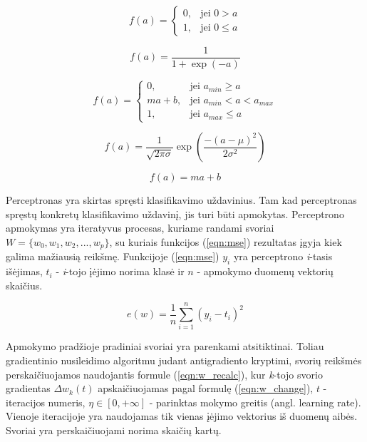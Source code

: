 \begin{equation}
	\label{eqn:unitStep}
	f(a) =
	\begin{cases}
		0, & \mbox{jei } 0 > a \\
		1, & \mbox{jei } 0 \leq a
	\end{cases}
\end{equation}

\begin{equation}
	\label{eqn:sigmoid}
	f(a) = \dfrac{1}{1 + \exp(-a)}
\end{equation}

\begin{equation}
	\label{eqn:pieceLinear}
	f(a) =
	\begin{cases}
		0, & \mbox{jei } a_{min} \geq a \\
		ma + b, & \mbox{jei } a_{min} < a < a_{max} \\
		1, & \mbox{jei } a_{max} \leq a
	\end{cases}
\end{equation}

\begin{equation}
	\label{eqn:gaussian}
	f(a) = \dfrac{1}{\sqrt{2\pi\sigma}} \exp(\dfrac{-(a - \mu)^2}{2\sigma^2})
\end{equation}

\begin{equation}
	\label{eqn:linear}
	f(a) = ma + b
\end{equation}

Perceptronas yra skirtas spręsti klasifikavimo uždavinius. Tam kad perceptronas spręstų konkretų klasifikavimo uždavinį, jis turi būti apmokytas. Perceptrono apmokymas yra iteratyvus procesas, kuriame randami svoriai $W = \{w_{0}, w_{1}, w_{2}, ..., w_{p}\}$, su kuriais funkcijos (\ref{eqn:mse}) rezultatas įgyja kiek galima mažiausią reikšmę. Funkcijoje (\ref{eqn:mse}) $y_i$ yra perceptrono \textit{i}-tasis išėjimas, $t_i$ - \textit{i}-tojo įėjimo norima klasė ir $n$ - apmokymo duomenų vektorių skaičius.

\begin{equation}
	\label{eqn:mse}
	e(w) = \dfrac{1}{n}\sum_{i=1}^{n}(y_i - t_i)^2
\end{equation}

Apmokymo pradžioje pradiniai svoriai yra parenkami atsitiktinai. Toliau gradientinio nusileidimo algoritmu judant antigradiento kryptimi, svorių reikšmės perskaičiuojamos naudojantis formule (\ref{eqn:w_recalc}), kur \textit{k}-tojo svorio gradientas $\Delta w_k(t)$ apskaičiuojamas pagal formulę (\ref{eqn:w_change}), $t$ - iteracijos numeris, $\eta \in [0, +\infty]$ - parinktas mokymo greitis (angl. learning rate). Vienoje iteracijoje yra naudojamas tik vienas įėjimo vektorius iš duomenų aibės. Svoriai yra perskaičiuojami norima skaičių kartų.

